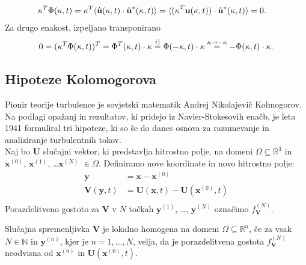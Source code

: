 \documentclass[mat2, tisk]{fmfdelo}
\newcommand{\R}{\mathbb R}
\newcommand{\N}{\mathbb N}
\newcommand{\bd}{\textbf}
\begin{document}
\begin{dokaz}
\begin{enumerate}
\begin{align*}
\end{align*}
\begin{align*}
\text{\bd{$\kappa$}}^T \Phi(\text{\bd{$\kappa$}}, t) &= \text{\bd{$\kappa$}}^T \langle \hat{\bd{u}}(\text{\bd{$\kappa$}}, t) \cdot \hat{\bd{u}}^*(\text{\bd{$\kappa$}}, t) \rangle = \langle \text{(\bd{$\kappa$}}^T \bd{u}(\text{\bd{$\kappa$}}, t)) \cdot \hat{\bd{u}}^*(\text{\bd{$\kappa$}}, t) \rangle = 0.
\end{align*}
Za drugo enakost, izpeljano transponirano
\begin{align*}
0 = (\text{\bd{$\kappa$}}^T \Phi(\text{\bd{$\kappa$}}, t))^T = \Phi^T(\text{\bd{$\kappa$}}, t) \cdot \text{\bd{$\kappa$}} \stackrel{i)}{=} \Phi(-\text{\bd{$\kappa$}}, t) \cdot \text{\bd{$\kappa$}} \stackrel{\text{\bd{$\kappa$}} \rightarrow - \text{\bd{$\kappa$}}}{=}  -\Phi(\text{\bd{$\kappa$}}, t) \cdot \text{\bd{$\kappa$}}.
\end{align*}
\end{enumerate}
\end{dokaz}

\subsection{Hipoteze Kolomogorova}
Pionir teorije turbulence je sovjetski matematik Andrej Nikolajevič Kolmogorov. 
Na podlagi opažanj in rezultatov, ki pridejo iz Navier-Stokesovih enačb, je
leta 1941 formuliral tri hipoteze, ki so še do danes osnova za 
razumevanje in analiziranje turbulentnih tokov.\\
\noindent
Naj bo $\bd{U}$ slučajni vektor, ki predstavlja hitrostno polje, 
na domeni $\Omega \subseteq \R^3$ in $\bd{x}^{(0)}$, $\bd{x}^{(1)}$, \dots $\bd{x}^{(N)}$ $\in \Omega$.
Definiramo nove koordinate in novo hitrostno polje:
\begin{align*}
\bd{y} &= \bd{x} - \bd{x}^{(0)} \\
\bd{V}(\bd{y}, t) &= \bd{U}(\bd{x}, t) - \bd{U}(\bd{x}^{(0)}, t) \\
\end{align*}
Porazdelitveno gostoto za $\bd{V}$ v $N$ točkah $\bd{y}^{(1)}$, \dots, $\bd{y}^{(N)}$
označimo $f_{\bd{V}}^{(N)}$. 

\begin{definicija}
Slučajna spremenljivka $\bd{V}$ je lokalno homogena na domeni 
$\Omega \subseteq \R^n$, če za vsak $N\in \N$ in $\bd{y}^{(n)}$, 
kjer je $n = 1, \dots, N$, velja, da je porazdelitvena gostota 
$f_\bd{V}^{(N)}$ neodvisna od $\bd{x}^{(0)}$ in $\bd{U}(\bd{x}^{(0)}, t)$.
\end{definicija}
\end{document}
